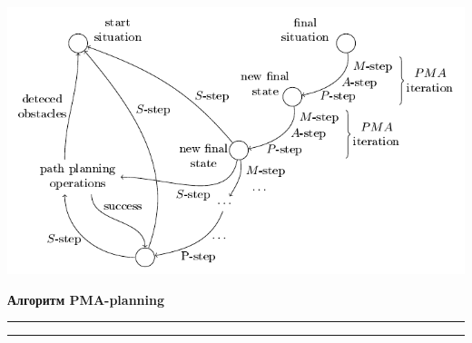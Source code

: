 \documentclass[preview,border=10pt]{standalone}
\begin{document}
	\begin{center}
		\includegraphics[width=\textwidth]{../images/strl/beh_plan}
	\end{center}
	
	\textbf{Алгоритм PMA-planning}
	\vspace*{2pt}
	\hrule
	\vspace*{1pt}
	\hrule
		
	\begin{algorithmic}[1]
		
		
	\end{algorithmic}
\end{document}
